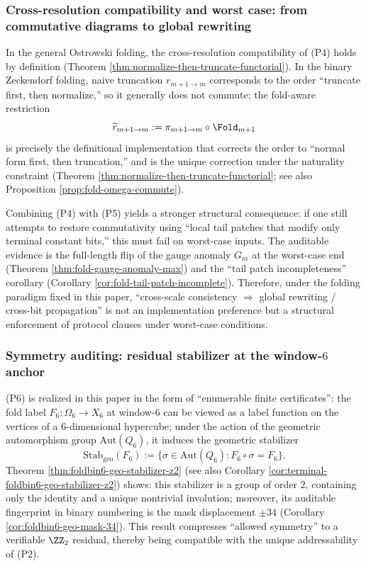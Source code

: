 \subsubsection{Cross-resolution compatibility and worst case: from commutative diagrams to global rewriting}
In the general Ostrowski folding, the cross-resolution compatibility of (P4) holds by definition (Theorem \ref{thm:normalize-then-truncate-functorial}). In the binary Zeckendorf folding, naive truncation \(r_{m+1\to m}\) corresponds to the order ``truncate first, then normalize,'' so it generally does not commute; the fold-aware restriction
\[
\widetilde r_{m+1\to m}:=\pi_{m+1\to m}\circ \Fold_{m+1}
\]
is precisely the definitional implementation that corrects the order to ``normal form first, then truncation,'' and is the unique correction under the naturality constraint (Theorem \ref{thm:normalize-then-truncate-functorial}; see also Proposition \ref{prop:fold-omega-commute}).\par
Combining (P4) with (P5) yields a stronger structural consequence: if one still attempts to restore commutativity using ``local tail patches that modify only terminal constant bits,'' this must fail on worst-case inputs. The auditable evidence is the full-length flip of the gauge anomaly \(G_m\) at the worst-case end (Theorem \ref{thm:fold-gauge-anomaly-max}) and the ``tail patch incompleteness'' corollary (Corollary \ref{cor:fold-tail-patch-incomplete}). Therefore, under the folding paradigm fixed in this paper, ``cross-scale consistency \(\Rightarrow\) global rewriting / cross-bit propagation'' is not an implementation preference but a structural enforcement of protocol clauses under worst-case conditions.

\subsubsection{Symmetry auditing: residual stabilizer at the window-\texorpdfstring{$6$}{6} anchor}
(P6) is realized in this paper in the form of ``enumerable finite certificates'': the fold label \(F_6:\Omega_6\to X_6\) at window-\(6\) can be viewed as a label function on the vertices of a 6-dimensional hypercube; under the action of the geometric automorphism group \(\mathrm{Aut}(Q_6)\), it induces the geometric stabilizer
\[
\mathrm{Stab}_{\mathrm{geo}}(F_6):=\{\sigma\in\mathrm{Aut}(Q_6):F_6\circ\sigma=F_6\}.
\]
Theorem \ref{thm:foldbin6-geo-stabilizer-z2} (see also Corollary \ref{cor:terminal-foldbin6-geo-stabilizer-z2}) shows: this stabilizer is a group of order \(2\), containing only the identity and a unique nontrivial involution; moreover, its auditable fingerprint in binary numbering is the mask displacement \(\pm 34\) (Corollary \ref{cor:foldbin6-geo-mask-34}). This result compresses ``allowed symmetry'' to a verifiable \(\ZZ_2\) residual, thereby being compatible with the unique addressability of (P2).

